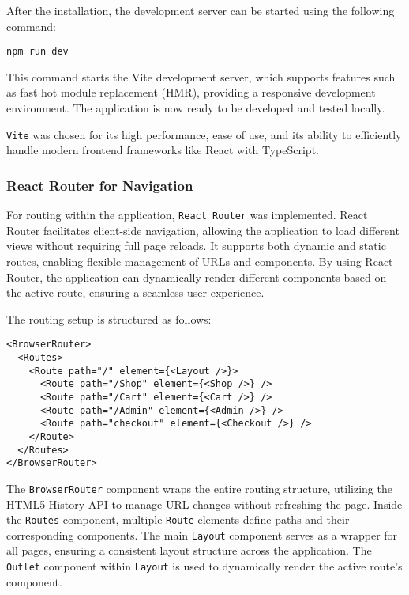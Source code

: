 After the installation, the development server can be started using the following command:

\begin{verbatim}
npm run dev
\end{verbatim}

This command starts the Vite development server, which supports features such as fast hot module replacement (HMR), providing a responsive development environment. The application is now ready to be developed and tested locally.

\texttt{Vite} was chosen for its high performance, ease of use, and its ability to efficiently handle modern frontend frameworks like React with TypeScript.



\subsubsection{React Router for Navigation}

For routing within the application, \texttt{React Router} was implemented. React Router facilitates client-side navigation, allowing the application to load different views without requiring full page reloads. It supports both dynamic and static routes, enabling flexible management of URLs and components. By using React Router, the application can dynamically render different components based on the active route, ensuring a seamless user experience.

The routing setup is structured as follows:

\begin{verbatim}
<BrowserRouter>
  <Routes>
    <Route path="/" element={<Layout />}>
      <Route path="/Shop" element={<Shop />} />
      <Route path="/Cart" element={<Cart />} />
      <Route path="/Admin" element={<Admin />} />
      <Route path="checkout" element={<Checkout />} />
    </Route>
  </Routes>
</BrowserRouter>
\end{verbatim}

The \texttt{BrowserRouter} component wraps the entire routing structure, utilizing the HTML5 History API to manage URL changes without refreshing the page. Inside the \texttt{Routes} component, multiple \texttt{Route} elements define paths and their corresponding components. The main \texttt{Layout} component serves as a wrapper for all pages, ensuring a consistent layout structure across the application. The \texttt{Outlet} component within \texttt{Layout} is used to dynamically render the active route's component.

